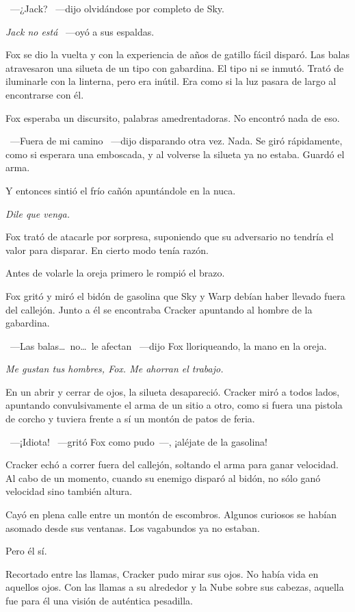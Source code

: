 ~---¿Jack? ~---dijo olvidándose por completo de Sky.

\emph{Jack no está} ~---oyó a sus espaldas.

Fox se dio la vuelta y con la experiencia de años de gatillo fácil disparó. Las balas atravesaron una silueta de un tipo con gabardina. El tipo ni se inmutó. Trató de iluminarle con la linterna, pero era inútil. Era como si la luz pasara de largo al encontrarse con él.

Fox esperaba un discursito, palabras amedrentadoras. No encontró nada de eso.

~---Fuera de mi camino ~---dijo disparando otra vez. Nada. Se giró rápidamente, como si esperara una emboscada, y al volverse la silueta ya no estaba. Guardó el arma.

Y entonces sintió el frío cañón apuntándole en la nuca.

\emph{Dile que venga.}

Fox trató de atacarle por sorpresa, suponiendo que su adversario no tendría el valor para disparar. En cierto modo tenía razón.

Antes de volarle la oreja primero le rompió el brazo.

Fox gritó y miró el bidón de gasolina que Sky y Warp debían haber llevado fuera del callejón. Junto a él se encontraba Cracker apuntando al hombre de la gabardina.

~---Las balas\dots\ no\dots\ le afectan ~---dijo Fox lloriqueando, la mano en la oreja.

\emph{Me gustan tus hombres, Fox. Me ahorran el trabajo.}

En un abrir y cerrar de ojos, la silueta desapareció. Cracker miró a todos lados, apuntando convulsivamente el arma de un sitio a otro, como si fuera una pistola de corcho y tuviera frente a sí un montón de patos de feria.

~---¡Idiota! ~---gritó Fox como pudo~---, ¡aléjate de la gasolina!

Cracker echó a correr fuera del callejón, soltando el arma para ganar velocidad. Al cabo de un momento, cuando su enemigo disparó al bidón, no sólo ganó velocidad sino también altura.

Cayó en plena calle entre un montón de escombros. Algunos curiosos se habían asomado desde sus ventanas. Los vagabundos ya no estaban.

Pero él sí.

Recortado entre las llamas, Cracker pudo mirar sus ojos. No había vida en aquellos ojos. Con las llamas a su alrededor y la Nube sobre sus cabezas, aquella fue para él una visión de auténtica pesadilla.

